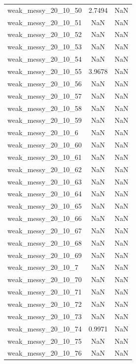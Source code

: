 \begin{longtable}{lcc}
weak\_messy\_20\_10\_50    &   2.7494 &     NaN \\
weak\_messy\_20\_10\_51    &      NaN &     NaN \\
weak\_messy\_20\_10\_52    &      NaN &     NaN \\
weak\_messy\_20\_10\_53    &      NaN &     NaN \\
weak\_messy\_20\_10\_54    &      NaN &     NaN \\
weak\_messy\_20\_10\_55    &   3.9678 &     NaN \\
weak\_messy\_20\_10\_56    &      NaN &     NaN \\
weak\_messy\_20\_10\_57    &      NaN &     NaN \\
weak\_messy\_20\_10\_58    &      NaN &     NaN \\
weak\_messy\_20\_10\_59    &      NaN &     NaN \\
weak\_messy\_20\_10\_6     &      NaN &     NaN \\
weak\_messy\_20\_10\_60    &      NaN &     NaN \\
weak\_messy\_20\_10\_61    &      NaN &     NaN \\
weak\_messy\_20\_10\_62    &      NaN &     NaN \\
weak\_messy\_20\_10\_63    &      NaN &     NaN \\
weak\_messy\_20\_10\_64    &      NaN &     NaN \\
weak\_messy\_20\_10\_65    &      NaN &     NaN \\
weak\_messy\_20\_10\_66    &      NaN &     NaN \\
weak\_messy\_20\_10\_67    &      NaN &     NaN \\
weak\_messy\_20\_10\_68    &      NaN &     NaN \\
weak\_messy\_20\_10\_69    &      NaN &     NaN \\
weak\_messy\_20\_10\_7     &      NaN &     NaN \\
weak\_messy\_20\_10\_70    &      NaN &     NaN \\
weak\_messy\_20\_10\_71    &      NaN &     NaN \\
weak\_messy\_20\_10\_72    &      NaN &     NaN \\
weak\_messy\_20\_10\_73    &      NaN &     NaN \\
weak\_messy\_20\_10\_74    &   0.9971 &     NaN \\
weak\_messy\_20\_10\_75    &      NaN &     NaN \\
weak\_messy\_20\_10\_76    &      NaN &     NaN \\

\end{longtable}
